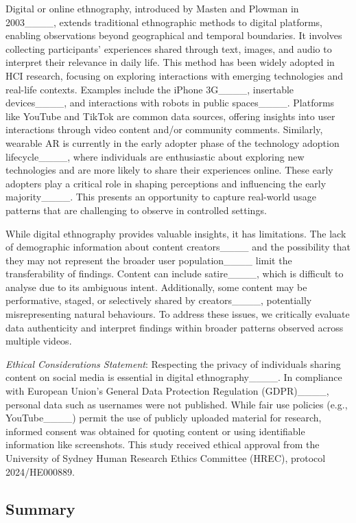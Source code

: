 Digital or online ethnography, introduced by Masten and Plowman in 2003____, extends traditional ethnographic methods to digital platforms, enabling observations beyond geographical and temporal boundaries. It involves collecting participants' experiences shared through text, images, and audio to interpret their relevance in daily life. This method has been widely adopted in HCI research, focusing on exploring interactions with emerging technologies and real-life contexts. Examples include the iPhone 3G____, insertable devices____, and interactions with robots in public spaces____. Platforms like YouTube and TikTok are common data sources, offering insights into user interactions through video content and/or community comments. Similarly, wearable AR is currently in the early adopter phase of the technology adoption lifecycle____, where individuals are enthusiastic about exploring new technologies and are more likely to share their experiences online. These early adopters play a critical role in shaping perceptions and influencing the early majority____. This presents an opportunity to capture real-world usage patterns that are challenging to observe in controlled settings.

While digital ethnography provides valuable insights, it has limitations. The lack of demographic information about content creators____ and the possibility that they may not represent the broader user population____ limit the transferability of findings. Content can include satire____, which is difficult to analyse due to its ambiguous intent. Additionally, some content may be performative, staged, or selectively shared by creators____, potentially misrepresenting natural behaviours. To address these issues, we critically evaluate data authenticity and interpret findings within broader patterns observed across multiple videos.

\textit{Ethical Considerations Statement}: Respecting the privacy of individuals sharing content on social media is essential in digital ethnography____. In compliance with European Union’s General Data Protection Regulation (GDPR)____, personal data such as usernames were not published. While fair use policies (e.g., YouTube____) permit the use of publicly uploaded material for research, informed consent was obtained for quoting content or using identifiable information like screenshots. This study received ethical approval from the University of Sydney Human Research Ethics Committee (HREC), protocol 2024/HE000889.

\subsection{Summary}

